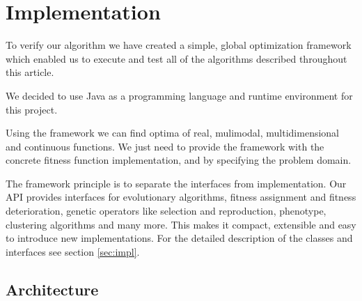 

\chapter{Implementation}
\label{ch:Implementation}
To verify our algorithm we have created a simple, global optimization framework
which enabled us to execute and test all of the algorithms described throughout
this article.

We decided to use Java as a programming language and runtime
environment for this project. 

Using the framework we can find optima of real, mulimodal, multidimensional and
continuous functions. We just need to provide the framework with the concrete
fitness function implementation, and by specifying the problem domain.

The framework principle is to separate the interfaces from implementation.
Our API provides interfaces for evolutionary algorithms, fitness assignment
and fitness deterioration, genetic operators like selection and reproduction,
phenotype, clustering algorithms and many more. This makes it compact,
extensible and easy to introduce new implementations.
For the detailed description of the classes and interfaces see section
\ref{sec:impl}.

\section{Architecture}
\label{sec:architecture}

